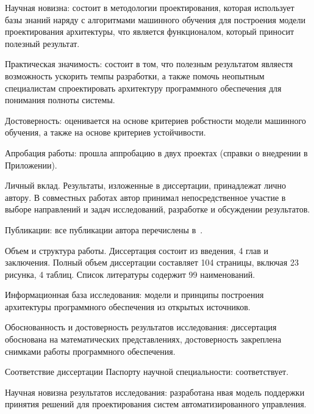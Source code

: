 Научная новизна: состоит в методологии проектирования, которая использует базы знаний наряду с алгоритмами машинного обучения для построения модели проектирования архитектуры, что является функционалом, который приносит полезный результат.

Практическая значимость: состоит в том, что полезным результатом являестя возможность ускорить темпы разработки, а также помочь неопытным специалистам спроектировать архитектуру программного обеспечения для понимания полноты системы.

Достоверность: оценивается на основе критериев робстности модели машинного обучения, а также на основе критериев устойчивости.

Апробация работы: прошла аппробацию в двух проектах (справки о внедрении в Приложении).

Личный вклад. Результаты, изложенные в диссертации, принадлежат лично автору. В совместных работах автор принимал непосредственное участие в выборе направлений и задач исследований, разработке и обсуждении результатов.

Публикации: все публикации автора перечислены в~\cite{aaij2022searches, baptista2021angular, leite2021observation,baptista2021searches,collaboration2021measurement,baptista2021measurement,aaij2021precision,aaij2022identification,bediaga2020measurement, aaij2021constraints,   onderwater2020study, aaij2022arxiv,     aaij2019arxiv,aaij2021evidence,aaij2020aps,baptista2021observation,baptista2021search,aaij2020isospin,  aaij2019precision,aaij2019search, lhcb2108evidence,aaij2022study,         aaij2022first,aaij2022j,  aaij2022observation, aaij2022tests}.

Объем и структура работы. Диссертация состоит из введения, 4 глав и заключения. Полный объем диссертации составляет 104 страницы, включая 23 рисунка, 4 таблиц. Список литературы содержит 99 наименований.

Информационная база исследования: модели и принципы построения архитектуры программного обеспечения из открытых источников.

Обоснованность и достоверность результатов исследования: диссертация обоснована на математических представлениях, достоверность закреплена снимками работы программного обеспечения.

Соответствие диссертации Паспорту научной специальности: соответствует.

Научная новизна результатов исследования: разработана нвая модель поддержки принятия решений для проектирования систем автоматизированного управления.

